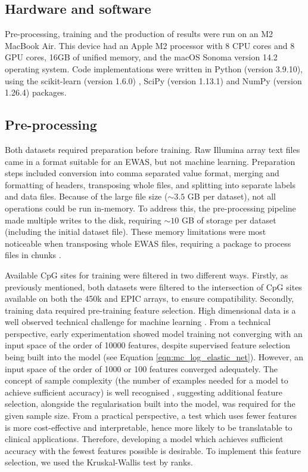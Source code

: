 \documentclass[draft]{article} %
\begin{document}
\subsection{Hardware and software}
Pre-processing, training and the production of results were run on an M2 MacBook Air. This device had an Apple M2 processor with 8 CPU cores and 8 GPU cores, 16GB of unified memory, and the macOS Sonoma version 14.2 operating system. Code implementations were written in Python (version 3.9.10), using the scikit-learn (version 1.6.0) \cite{scikit-learn}, SciPy (version 1.13.1) \cite{SciPy} and NumPy (version 1.26.4) \cite{harris2020array} packages.

\subsection{Pre-processing} \label{sec:pre-processing}
Both datasets required preparation before training. Raw Illumina array text files came in a format suitable for an EWAS, but not machine learning. Preparation steps included conversion into comma separated value format, merging and formatting of headers, transposing whole files, and splitting into separate labels and data files. Because of the large file size (\(\sim\!3.5\) GB per dataset), not all operations could be run in-memory. To address this, the pre-processing pipeline made multiple writes to the disk, requiring \(\sim\!10\) GB of storage per dataset (including the initial dataset file). These memory limitations were most noticeable when transposing whole EWAS files, requiring a package to process files in chunks \cite{transposecsv}.

Available CpG sites for training were filtered in two different ways. Firstly, as previously mentioned, both datasets were filtered to the intersection of CpG sites available on both the 450k and EPIC arrays, to ensure compatibility. Secondly, training data required pre-training feature selection. High dimensional data is a well observed technical challenge for machine learning \cite{cai2018feature}. From a technical perspective, early experimentation showed model training not converging with an input space of the order of \num{10000} features, despite supervised feature selection being built into the model (see Equation \ref{eqn:mc_log_elastic_net}). However, an input space of the order of \num{1000} or \num{100} features converged adequately. The concept of sample complexity (the number of examples needed for a model to achieve sufficient accuracy) is well recognised \cite{blum1997selection}, suggesting additional feature selection, alongside the regularisation built into the model, was required for the given sample size. From a practical perspective, a test which uses fewer features is more cost-effective and interpretable, hence more likely to be translatable to clinical applications. Therefore, developing a model which achieves sufficient accuracy with the fewest features possible is desirable. To implement this feature selection, we used the Kruskal-Wallis test by ranks.
\end{document}
